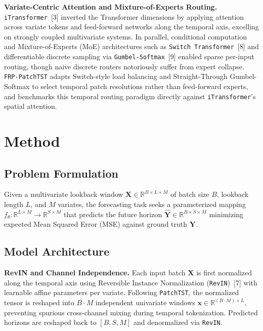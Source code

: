 \documentclass[11pt, letterpaper]{article}
\begin{document}
\textbf{Variate-Centric Attention and Mixture-of-Experts Routing.} \texttt{iTransformer}~[3] inverted the Transformer dimensions by applying attention across variate tokens and feed-forward networks along the temporal axis, excelling on strongly coupled multivariate systems. In parallel, conditional computation and Mixture-of-Experts (MoE) architectures such as \texttt{Switch Transformer}~[8] and differentiable discrete sampling via \texttt{Gumbel-Softmax}~[9] enabled sparse per-input routing, though naive discrete routers notoriously suffer from expert collapse. \texttt{FRP-PatchTST} adapts Switch-style load balancing and Straight-Through Gumbel-Softmax to select temporal patch resolutions rather than feed-forward experts, and benchmarks this temporal routing paradigm directly against \texttt{iTransformer}'s spatial attention.

\section{Method}

\subsection{Problem Formulation}
Given a multivariate lookback window $\mathbf{X} \in \mathbb{R}^{B \times L \times M}$ of batch size $B$, lookback length $L$, and $M$ variates, the forecasting task seeks a parameterized mapping $f_\theta: \mathbb{R}^{L \times M} \to \mathbb{R}^{S \times M}$ that predicts the future horizon $\hat{\mathbf{Y}} \in \mathbb{R}^{B \times S \times M}$ minimizing expected Mean Squared Error (MSE) against ground truth $\mathbf{Y}$.

\subsection{Model Architecture}
\textbf{RevIN and Channel Independence.} Each input batch $\mathbf{X}$ is first normalized along the temporal axis using Reversible Instance Normalization (\texttt{RevIN})~[7] with learnable affine parameters per variate. Following \texttt{PatchTST}, the normalized tensor is reshaped into $B \cdot M$ independent univariate windows $\mathbf{x} \in \mathbb{R}^{(B\cdot M) \times L}$, preventing spurious cross-channel mixing during temporal tokenization. Predicted horizons are reshaped back to $[B, S, M]$ and denormalized via \texttt{RevIN}.
\end{document}
